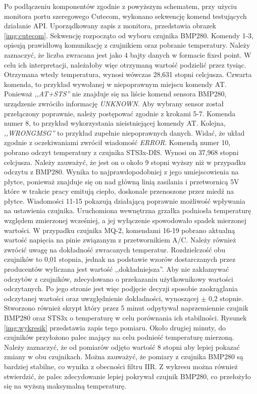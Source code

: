 Po podłączeniu komponentów zgodnie z powyższym schematem, przy użyciu monitora portu szeregowego Cutecom, wykonano sekwencję komend testujących działanie API. Uporządkowany zapis z monitora, przedstawia obrazek \ref{img:cutecom}. Sekwencję rozpocząto od wyboru czujnika BMP280. Komendy 1-3, opisują prawidłową komunikację z czujnikiem oraz pobranie temperatury. Należy zaznaczyć, że liczba zwracana jest jako 4 bajty danych w formacie fixed point. W celu ich interpretacji, należałoby więc otrzymaną wartość podzielić przez tysiąc. Otrzymana wtedy temperatura, wynosi wówczas 28,631 stopni celcjusza. Czwarta komenda, to przykład wywołanej w niepoprawnym miejscu komendy AT. Ponieważ \textit{,,AT+STS''} nie znajduje się na liście komend sensora BMP280, urządzenie zwróciło informację \textit{UNKNOWN}. Aby wybrany sensor został przełączony poprawnie, należy postępować zgodnie z krokami 5-7. Komenda numer 8, to przykład wykorzystania nieistniejącej komendy AT. Kolejna, \textit{,,WRONGMSG''} to przykład zupełnie niepoprawnych danych. Widać, że układ zgodnie z oczekiwaniami zwrócił wiadomość \textit{ERROR}. Komendą numer 10, pobrano odczyt temperatury z czujnika STS3x-DIS. Wynosi on 37,968 stopni celcjusza. Należy zauważyć, że jest on o około 9 stopni wyższy niż w przypadku odczytu z BMP280. Wynika to  najprawdopodobniej z jego umiejscowienia na płytce, ponieważ znajduje się on nad główną linią zasilania i przetwornicą 5V które w trakcie pracy emitują ciepło, doskonale przenoszone przez miedź na płytce. Wiadomości 11-15 pokazują działającą poprawnie możliwość wpływania na ustawienia czujnika. Uruchomiona wewnętrzna grzałka podniosła temperaturę względem zmierzonej wcześniej, a jej wyłączenie spowodowało spadek mierzonej wartości. W przypadku czujnika MQ-2, komendami 16-19 pobrano aktualną wartość napięcia na pinie związanym z przetwornikiem A/C.\newline
Należy również zwrócić uwagę na dokładność zwracanych temperatur. Rozdzielczość obu czujników to 0,01 stopnia, jednak na podstawie wzorów dostarczanych przez producentów wyliczana jest wartość ,,dokładniejsza''. Aby nie zakłamywać odczytów z czujników, zdecydowano o przekazaniu użytkownikowy wartości odczytanych. Po jego stronie jest więc podjęcie decyzji sposobie zaokrąglania odczytanej wartości oraz uwzględnienie dokładności, wynoszącej $\pm$ 0,2 stopnie. Stworzono również skrypt który przez 5 minut odpytywał naprzemiennie czujnik BMP280 oraz STS3x o temperaturę w celu porównania ich stabilności. Rysunek \ref{img:wykresik} przedstawia zapis tego pomiaru. Około drugiej minuty, do czujników przyłożono palec mający na celu podnieść temperaturę mierzoną. Należy zaznaczyć, że od pomiarów odjęto wartość 8 stopni aby lepiej pokazać zmiany w obu czujnikach. Można zauważyć, że pomiary z czujnika BMP280 są bardziej stabilne, co wynika z obecności filtru IIR. Z wykresu można również stwierdzić, że palec zdecydowanie lepiej pokrywał czujnik BMP280, co przełożyło się na wyższą maksymalną temperaturę.

